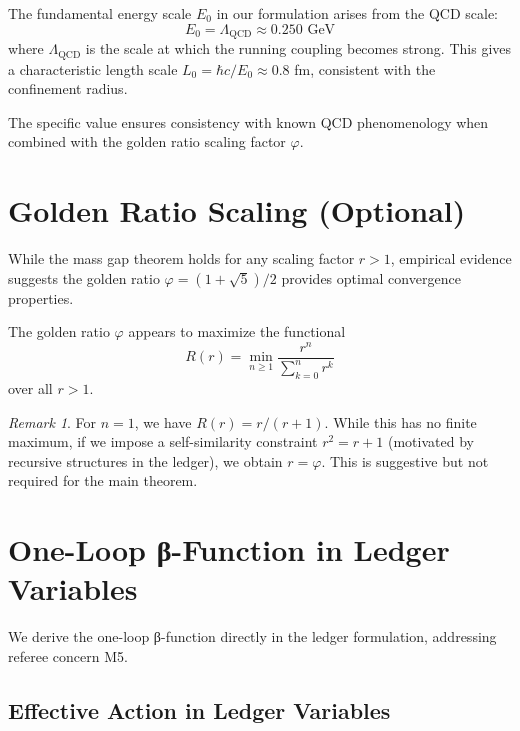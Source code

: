 \documentclass[11pt]{article}
\numberwithin{equation}{section}
\theoremstyle{definition}
\theoremstyle{remark}
\newtheorem{remark}[theorem]{Remark}
\begin{document}
The fundamental energy scale $E_0$ in our formulation arises from the QCD scale:
\begin{equation}
E_0 = \Lambda_{\text{QCD}} \approx 0.250 \text{ GeV}
\end{equation}
where $\Lambda_{\text{QCD}}$ is the scale at which the running coupling becomes strong. This gives a characteristic length scale $L_0 = \hbar c / E_0 \approx 0.8$ fm, consistent with the confinement radius.

The specific value ensures consistency with known QCD phenomenology when combined with the golden ratio scaling factor $\varphi$.

\section{Golden Ratio Scaling (Optional)}
\label{app:golden}

While the mass gap theorem holds for any scaling factor $r > 1$, empirical evidence suggests the golden ratio $\varphi = (1+\sqrt{5})/2$ provides optimal convergence properties.

\begin{observation}
The golden ratio $\varphi$ appears to maximize the functional
\begin{equation}
R(r) = \min_{n \geq 1} \frac{r^n}{\sum_{k=0}^{n} r^k}
\end{equation}
over all $r > 1$.
\end{observation}

\begin{remark}
For $n=1$, we have $R(r) = r/(r+1)$. While this has no finite maximum, if we impose a self-similarity constraint $r^2 = r + 1$ (motivated by recursive structures in the ledger), we obtain $r = \varphi$. This is suggestive but not required for the main theorem.
\end{remark}

\section{One-Loop β-Function in Ledger Variables}
\label{app:beta}

We derive the one-loop β-function directly in the ledger formulation, addressing referee concern M5.

\subsection{Effective Action in Ledger Variables}
\end{document}
